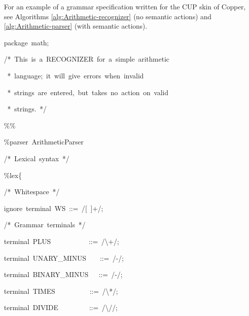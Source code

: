 \documentclass[12pt,english,twoside]{report}
\newenvironment{codeblock}
{\begin{list}{}{
\setlength{\rightmargin}{\leftmargin}
\setlength{\listparindent}{0pt}%
\raggedright
\setlength{\itemsep}{0pt}
\setlength{\parsep}{0pt}
\normalfont\ttfamily}%
 \item[]}
{\end{list}}
\begin{document}
For an example of a grammar specification written for the CUP skin
of Copper, see Algorithms \ref{alg:Arithmetic-recognizer} (no semantic
actions) and \ref{alg:Arithmetic-parser} (with semantic actions).
%
\begin{algorithm}
\begin{codeblock}
{\small package~math;}{\small \par}

{\small /{*}~This~is~a~RECOGNIZER~for~a~simple~arithmetic}{\small \par}

~{\small {*}~language;~it~will~give~errors~when~invalid}{\small \par}

~{\small {*}~strings~are~entered,~but~takes~no~action~on~valid}{\small \par}

~{\small {*}~strings.~{*}/}{\small \par}

{\small \%\%}{\small \par}

{\small \%parser~ArithmeticParser}{\small \par}



{\small /{*}~Lexical~syntax~{*}/}{\small \par}

{\small \%lex\{}{\small \par}
\begin{codeblock}
{\small /{*}~Whitespace~{*}/}{\small \par}

{\small ignore~terminal~WS~::=~/{[}~]+/;}{\small \par}



{\small /{*}~Grammar~terminals~{*}/}{\small \par}

{\small terminal~PLUS~~~~~~~~~~~::=~/\textbackslash{}+/;}{\small \par}

{\small terminal~UNARY\_MINUS~~~~::=~/-/;}{\small \par}

{\small terminal~BINARY\_MINUS~~~::=~/-/;}{\small \par}

{\small terminal~TIMES~~~~~~~~~~::=~/\textbackslash{}{*}/;}{\small \par}

{\small terminal~DIVIDE~~~~~~~~~::=~/\textbackslash{}//;}{\small \par}


\end{codeblock}
\end{codeblock}
\end{algorithm}
\end{document}
